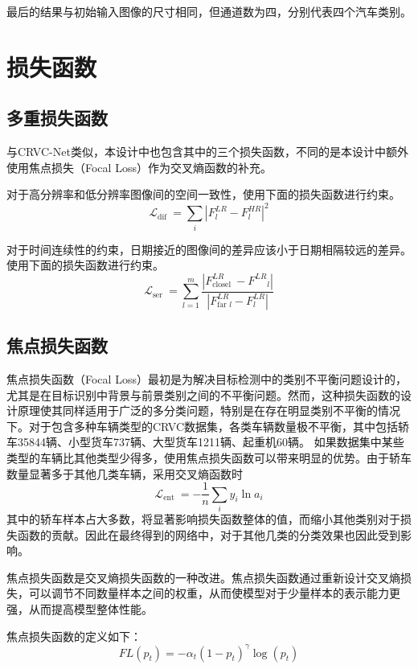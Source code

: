 最后的结果与初始输入图像的尺寸相同，但通道数为四，分别代表四个汽车类别。
\section{损失函数}
\subsection{多重损失函数}
与CRVC-Net类似，本设计中也包含其中的三个损失函数，不同的是本设计中额外使用焦点损失（Focal Loss）作为交叉熵函数的补充。

对于高分辨率和低分辨率图像间的空间一致性，使用下面的损失函数进行约束。
\begin{equation}
    \mathcal{L}_{\text {dif }}=\sum_{i}\left|F_l^{L R}-F^{HR}_{l}\right|^2
\end{equation}

对于时间连续性的约束，日期接近的图像间的差异应该小于日期相隔较远的差异。使用下面的损失函数进行约束。
\begin{equation}
    \mathcal{L}_{\text {ser }}=\sum_{l=1}^{m} \frac{\left|F_{\text {closel }}^{L R}-F^{L R}{ }_{l}\right|}{\left|F_{\text {far } l}^{L R}-F^{L R}_ l\right|}
\end{equation}

\subsection{焦点损失函数}
焦点损失函数（Focal Loss）\cite{2018FocalLossDenseObjectDetection}最初是为解决目标检测中的类别不平衡问题设计的，尤其是在目标识别中背景与前景类别之间的不平衡问题。然而，这种损失函数的设计原理使其同样适用于广泛的多分类问题，特别是在存在明显类别不平衡的情况下。对于包含多种车辆类型的CRVC数据集，各类车辆数量极不平衡，其中包括轿车35844辆、小型货车737辆、大型货车1211辆、起重机60辆。 如果数据集中某些类型的车辆比其他类型少得多，使用焦点损失函数可以带来明显的优势。由于轿车数量显著多于其他几类车辆，采用交叉熵函数时
\begin{equation}
    \mathcal{L}_{\text {ent }}=-\frac{1}{n} \sum_{i} y_{i} \ln a_{i}
\end{equation}
其中的轿车样本占大多数，将显著影响损失函数整体的值，而缩小其他类别对于损失函数的贡献。因此在最终得到的网络中，对于其他几类的分类效果也因此受到影响。


焦点损失函数是交叉熵损失函数的一种改进。焦点损失函数通过重新设计交叉熵损失，可以调节不同数量样本之间的权重，从而使模型对于少量样本的表示能力更强，从而提高模型整体性能。


焦点损失函数的定义如下：
\begin{equation}
    FL(p_t) = -\alpha_t (1 - p_t)^\gamma \log(p_t)
\end{equation}

